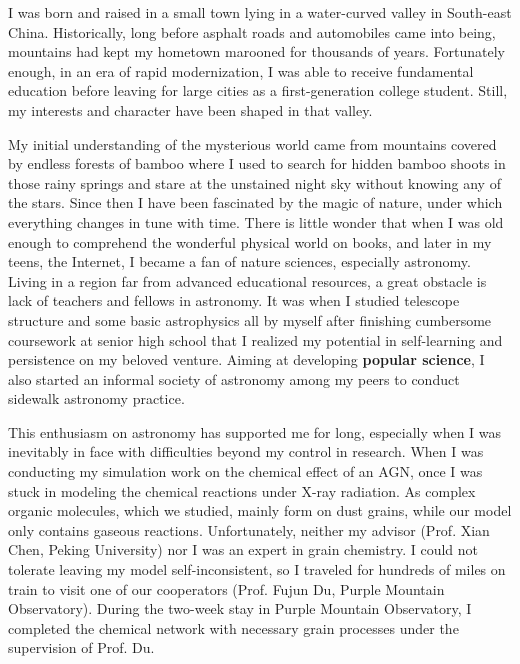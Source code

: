 \documentclass[11pt, a4paper]{awesome-cv} %
\begin{document}
\makecvheader %



\begin{cvletter}


I was born and raised in a small town lying in a water-curved valley in South-east China. Historically, long before asphalt roads and automobiles came into being, mountains had kept my hometown marooned for thousands of years. Fortunately enough, in an era of rapid modernization, I was able to receive fundamental education before leaving for large cities as a first-generation college student. Still, my interests and character have been shaped in that valley.

My initial understanding of the mysterious world came from mountains covered by endless forests of bamboo where I used to search for hidden bamboo shoots in those rainy springs and stare at the unstained night sky without knowing any of the stars. Since then I have been fascinated by the magic of nature, under which everything changes in tune with time. There is little wonder that when I was old enough to comprehend the wonderful physical world on books, and later in my teens, the Internet, I became a fan of nature sciences, especially astronomy. Living in a region far from advanced educational resources, a great obstacle is lack of teachers and fellows in astronomy. It was when I studied telescope structure and some basic astrophysics all by myself after finishing cumbersome coursework at senior high school that I realized my potential in self-learning and persistence on my beloved venture. Aiming at developing \textbf{popular science}, I also started an informal society of astronomy among my peers to conduct sidewalk astronomy practice.

This enthusiasm on astronomy has supported me for long, especially when I was inevitably in face with difficulties beyond my control in research. When I was conducting my simulation work on the chemical effect of an AGN, once I was stuck in modeling the chemical reactions under X-ray radiation. As complex organic molecules, which we studied, mainly form on dust grains, while our model only contains gaseous reactions. Unfortunately, neither my advisor (Prof. Xian Chen, Peking University) nor I was an expert in grain chemistry. I could not tolerate leaving my model self-inconsistent, so I traveled for hundreds of miles on train to visit one of our cooperators (Prof. Fujun Du, Purple Mountain Observatory). During the two-week stay in Purple Mountain Observatory, I completed the chemical network with necessary grain processes under the supervision of Prof. Du.


\end{cvletter}
\end{document}
